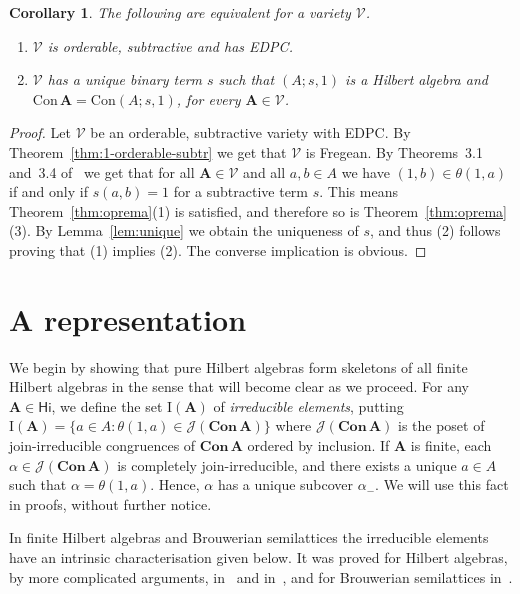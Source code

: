 \documentclass{amsart}
\newtheorem{cor}[theorem]{Corollary}
\newcommand{\alg}[1]{\mathbf{#1}}
\newcommand{\var}[1]{\mathsf{#1}}
\newcommand{\Con}[1]{\mathbf{Con}\, #1}
\newcommand{\con}[1]{\mathrm{Con}\, #1}
\newcommand{\J}[1]{\mathcal{J}(#1)}
\newcommand{\irr}[1]{\mathrm{I}(#1)}
\begin{document}
\begin{cor}\label{cor:agliano}
The following are equivalent for a variety $\mathcal{V}$.
\begin{enumerate}  
\item $\mathcal{V}$ is orderable, subtractive and has EDPC.
\item $\mathcal{V}$ has a unique binary term $s$ such that
$(A;s,1)$ is a Hilbert algebra and
$\con{\alg{A}} = \mathrm{Con}(A;s,1)$,
for every $\alg{A}\in\mathcal{V}$.
\end{enumerate}
\end{cor}

\begin{proof}
Let $\mathcal{V}$ be an orderable, subtractive variety with EDPC.
By Theorem~\ref{thm:1-orderable-subtr} we get that $\mathcal{V}$ is Fregean.
By Theorems~3.1 and~3.4 of~\cite{AU97a}  
we get that for all $\alg{A}\in\mathcal{V}$ and all
$a,b\in A$ we have $(1,b)\in \theta(1,a)$ if and only if $s(a,b) = 1$
for a subtractive term $s$. This means Theorem~\ref{thm:oprema}(1)
is satisfied, and therefore so is Theorem~\ref{thm:oprema}(3). 
By Lemma~\ref{lem:unique} we obtain the uniqueness of $s$, and thus (2) follows
proving that (1) implies (2). The converse implication is obvious. 
\end{proof}



\section{A representation}

We begin by showing that pure Hilbert algebras form skeletons of all finite Hilbert
algebras in the sense that will become clear as we proceed.  
For any $\alg{A}\in\var{Hi}$, we 
define the set $\irr{\alg{A}}$ of \emph{irreducible elements}, putting 
$\irr{\alg{A}} = \{a\in A: \theta(1,a)\in \J{\Con{\alg{A}}}\}$
where $\J{\Con{\alg{A}}}$ is the poset of join-irreducible congruences of
$\Con{\alg{A}}$ ordered by inclusion. If $\alg{A}$ is finite,
each $\alpha\in \J{\Con{\alg{A}}}$ is completely join-irreducible, and
there exists a unique $a\in A$ such that $\alpha = \theta(1,a)$.
Hence, $\alpha$ has a unique subcover $\alpha_-$.
We will use this fact in proofs, without further notice. 

In finite Hilbert algebras and Brouwerian semilattices
the irreducible elements have an 
intrinsic characterisation given below. It was proved for Hilbert algebras,
by more complicated arguments, in~\cite{PS17} and in~\cite{CC05}, and for
Brouwerian semilattices in~\cite{Koh81}.
\end{document}

